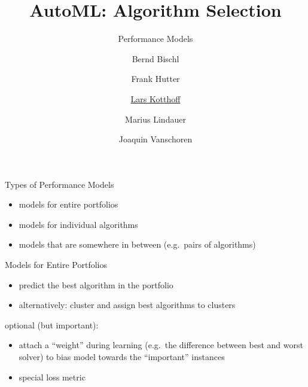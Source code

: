 



\title[AutoML: Overview]{AutoML: Algorithm Selection} %
\subtitle{Performance Models} %
\author[Marius Lindauer]{Bernd Bischl \and Frank Hutter \and \underline{Lars Kotthoff}\newline \and Marius Lindauer \and Joaquin Vanschoren}
\institute{}
\date{}



	
	\maketitle
	

\begin{frame}{Types of Performance Models}
\begin{itemize}
\item models for entire portfolios
\item models for individual algorithms
\item models that are somewhere in between (e.g.\ pairs of algorithms)
\end{itemize}
\end{frame}

\begin{frame}{Models for Entire Portfolios}
\begin{itemize}
\item predict the best algorithm in the portfolio
\item alternatively: cluster and assign best algorithms to clusters
\end{itemize}
optional (but important):
\begin{itemize}
\item attach a ``weight'' during learning (e.g.\ the difference between best
    and worst solver) to bias model towards the ``important'' instances
\item special loss metric
\end{itemize}
\end{frame}

